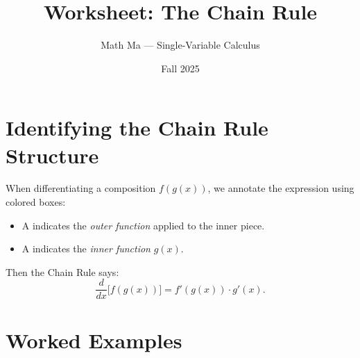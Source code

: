 \documentclass[11pt]{article}
\title{Worksheet: The Chain Rule}
\author{Math Ma --- Single-Variable Calculus}
\date{Fall 2025}
\begin{document}
\maketitle

\section*{Identifying the Chain Rule Structure}

When differentiating a composition $f(g(x))$, we annotate the expression using
colored boxes:
\begin{itemize}
  \item A  indicates the \emph{outer function} applied to the inner piece.
  \item A  indicates the \emph{inner function} $g(x)$.
\end{itemize}
Then the Chain Rule says:
\[
  \frac{d}{dx}\bigl[ f(g(x)) \bigr] = f'(g(x)) \cdot g'(x).
\]

\section*{Worked Examples}
\end{document}
